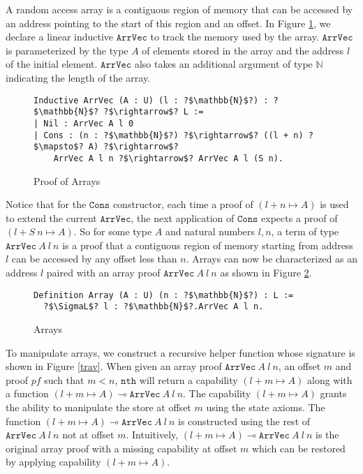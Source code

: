 \documentclass[sigplan,screen,review,anonymous]{acmart}
\newcommand{\SigmaL}{\Sigma_{\scriptscriptstyle L}}
\newcommand{\arrv}{\texttt{ArrVec}}
\begin{document}
A random access array is a contiguous region of memory that can be accessed by an address pointing to the start of this region and an offset. In Figure \ref{arrv}, we declare a linear inductive $\arrv$ to track the memory used by the array. $\arrv$ is parameterized by the type $A$ of elements stored in the array and the address $l$ of the initial element. $\arrv$ also takes an additional argument of type $\mathbb{N}$ indicating the length of the array.

\begin{figure}[h]
  \caption{Proof of Arrays}
  \begin{verbatim}
Inductive ArrVec (A : U) (l : ?$\mathbb{N}$?) : ?$\mathbb{N}$? ?$\rightarrow$? L :=
| Nil : ArrVec A l 0
| Cons : (n : ?$\mathbb{N}$?) ?$\rightarrow$? ((l + n) ?$\mapsto$? A) ?$\rightarrow$? 
    ArrVec A l n ?$\rightarrow$? ArrVec A l (S n).
  \end{verbatim}
  \label{arrv}
  \Description{}
\end{figure}

Notice that for the $\texttt{Cons}$ constructor, each time a proof of $(l + n \mapsto A)$ is used to extend the current $\arrv$, the next application of $\texttt{Cons}$ expects a proof of $(l + S\ n \mapsto A)$. So for some type $A$ and natural numbers $l, n$, a term of type $\arrv\ A\ l\ n$ is a proof that a contiguous region of memory starting from address $l$ can be accessed by any offset less than $n$. Arrays can now be characterized as an address $l$ paired with an array proof $\arrv\ A\ l\ n$ as shown in Figure \ref{array}.

\begin{figure}[h]
  \caption{Arrays}
  \begin{verbatim}
Definition Array (A : U) (n : ?$\mathbb{N}$?) : L := 
  ?$\SigmaL$? l : ?$\mathbb{N}$?.ArrVec A l n.
  \end{verbatim}
  \label{array}
  \Description{}
\end{figure}

To manipulate arrays, we construct a recursive helper function whose signature is shown in Figure \ref{trav}. When given an array proof $\arrv\ A\ l\ n$, an offset $m$ and proof $pf$ such that $m < n$, $\texttt{nth}$ will return a capability $(l + m \mapsto A)$ along with a function $(l + m \mapsto A) \multimap \arrv\ A\ l\ n$. The capability $(l + m \mapsto A)$ grants the ability to manipulate the store at offset $m$ using the state axioms. The function $(l + m \mapsto A) \multimap \arrv\ A\ l\ n$ is constructed using the rest of $\arrv\ A\ l\ n$ not at offset $m$. Intuitively, $(l + m \mapsto A) \multimap \arrv\ A\ l\ n$ is the original array proof with a missing capability at offset $m$ which can be restored by applying capability $(l + m \mapsto A)$.
\end{document}
